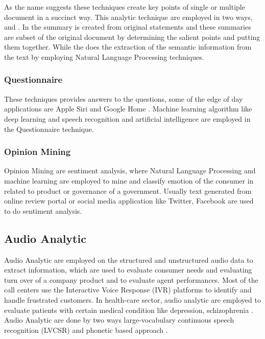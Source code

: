 \documentclass[sigconf]{acmart}
\begin{document}
As the name suggests these techniques create key points of single or multiple document in a succinct way. This analytic technique are employed in two ways, \cite{bigdata} and  \cite{bigdata}. In the  summary is created from original statements and these summaries are subset of the original document by determining the salient points and putting them together. While the  does the extraction of the semantic information from the text by employing Natural Language Processing techniques.

\subsubsection{Questionnaire}

These techniques provides answers to the questions, some of the edge of day applications are Apple Siri and Google Home \cite{bigdata}. Machine learning algorithm like deep learning and speech recognition and artificial intelligence are employed in the Questionnaire technique.

\subsubsection{Opinion Mining}

Opinion Mining are sentiment analysis, where Natural Language Processing and machine learning are employed to mine and classify emotion of the consumer in related to product or governance of a government. Usually text generated from online review portal or social media application like Twitter, Facebook are used to do sentiment analysis.


\subsection{Audio Analytic}

Audio Analytic are employed on the structured and unstructured audio data to extract information, which are used to evaluate consumer needs and evaluating turn over of a company product and to evaluate agent performances. Most of the call centers use the Interactive Voice Response (IVR) \cite{ivr} platforms to identify and handle frustrated customers. In health-care sector, audio analytic are employed to evaluate patients with certain medical condition like depression, schizophrenia \cite{bigdata}. Audio Analytic are done by two ways large-vocabulary continuous speech recognition (LVCSR) \cite{bigdata} and phonetic based approach \cite{bigdata}.
\end{document}
